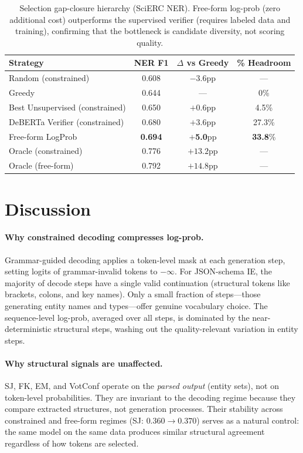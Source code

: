 \documentclass[11pt,a4paper]{article}
\newcommand{\bmark}[1]{\textbf{#1}}
\begin{document}
\begin{table}[t]
\centering
\caption{Selection gap-closure hierarchy (SciERC NER). Free-form log-prob (zero additional cost) outperforms the supervised verifier (requires labeled data and training), confirming that the bottleneck is candidate diversity, not scoring quality.}
\label{tab:hierarchy}
\small
\begin{tabular}{l ccc}
\toprule
Strategy & NER F1 & $\Delta$ vs Greedy & \% Headroom \\
\midrule
Random (constrained)              & 0.608 & $-3.6$pp & --- \\
Greedy                            & 0.644 & ---      & 0\% \\
Best Unsupervised (constrained)   & 0.650 & $+0.6$pp & 4.5\% \\
DeBERTa Verifier (constrained)    & 0.680 & $+3.6$pp & 27.3\% \\
Free-form LogProb                 & \bmark{0.694} & $+$\bmark{5.0}pp & \bmark{33.8}\% \\
\midrule
Oracle (constrained)              & 0.776 & $+13.2$pp & --- \\
Oracle (free-form)                & 0.792 & $+14.8$pp & --- \\
\bottomrule
\end{tabular}
\end{table}

\section{Discussion}
\label{sec:discussion}

\paragraph{Why constrained decoding compresses log-prob.}
Grammar-guided decoding applies a token-level mask at each generation step, setting logits of grammar-invalid tokens to $-\infty$. For JSON-schema IE, the majority of decode steps have a single valid continuation (structural tokens like brackets, colons, and key names). Only a small fraction of steps---those generating entity names and types---offer genuine vocabulary choice. The sequence-level log-prob, averaged over all steps, is dominated by the near-deterministic structural steps, washing out the quality-relevant variation in entity steps.

\paragraph{Why structural signals are unaffected.}
SJ, FK, EM, and VotConf operate on the \emph{parsed output} (entity sets), not on token-level probabilities. They are invariant to the decoding regime because they compare extracted structures, not generation processes. Their stability across constrained and free-form regimes (SJ: $0.360 \to 0.370$) serves as a natural control: the same model on the same data produces similar structural agreement regardless of how tokens are selected.
\end{document}
